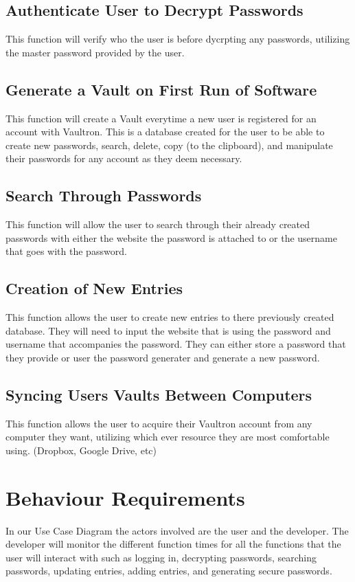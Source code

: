 \documentclass[11pt]{report}
\begin{document}
\subsection{Authenticate User to Decrypt Passwords}
This function will verify who the user is before dycrpting any passwords, utilizing 
the master password provided by the user.
\subsection{Generate a Vault on First Run of Software}
This function will create a Vault everytime a new user is registered for an account 
with Vaultron. This is a database created for the user to be able to create new
passwords, search, delete, copy (to the clipboard), and manipulate their passwords
for any account as they deem necessary.
\subsection{Search Through Passwords}
This function will allow the user to search through their already created passwords
with either the website the password is attached to or the username that goes with 
the password. 
\subsection{Creation of New Entries}
This function allows the user to create new entries to there previously created 
database. They will need to input the website that is using the password and
username that accompanies the password.  They can either store a password that
they provide or user the password generater and generate a new password.
\subsection{Syncing Users Vaults Between Computers}
This function allows the user to acquire their Vaultron account from any computer 
they want, utilizing which ever resource they are most comfortable using. (Dropbox, 
Google Drive, etc)

\section{Behaviour Requirements}
In our Use Case Diagram the actors involved are the user and the developer. The developer will monitor the 
different function times for all the functions that the user will interact with such as logging in, decrypting
passwords, searching passwords, updating entries, adding entries, and generating secure passwords. 
\end{document}
